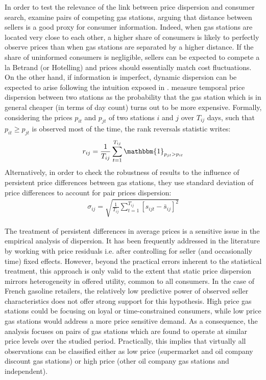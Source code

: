 \documentclass[english]{article}
\begin{document}
In order to test the relevance of the link between price dispersion and consumer search, \cite{TAP11} examine pairs of competing gas stations, arguing that distance between sellers is a good proxy for consumer information. Indeed, when gas stations are located very close to each other, a higher share of consumers is likely to perfectly observe prices than when gas stations are separated by a higher distance. If the share of uninformed consumers is negligible, sellers can be expected to compete a la Betrand (or Hotelling) and prices should essentially match cost fluctuations. On the other hand, if information is imperfect, dynamic dispersion can be expected to arise following the intuition exposed in \cite{VAR80}. \cite{TAP11} measure temporal price dispersion between two stations as the probability that the gas station which is in general cheaper (in terms of day count) turns out to be more expensive. Formally, considering the prices $p_{it}$ and $p_{jt}$ of two stations $i$ and $j$ over $T_{ij}$ days, such that $p_{it} \ge p_{jt}$ is observed most of the time, the rank reversals statistic writes:
\begin{align*}
r_{ij} = \frac{1}{T_{ij}} \sum_{t=1}^{T_{ij}} \mathbbm{1}_{p_{jt} > p_{it}}
\end{align*}
Alternatively, in order to check the robustness of results to the influence of persistent price differences between gas stations, they use standard deviation of price differences to account for pair prices dispersion:
\begin{align*}
\sigma_{ij} = \sqrt{\frac{1}{T_{ij}} \sum_{t=1}^{T_{ij}} [s_{ijt} - \bar{s}_{ij}]^2}
\end{align*}

The treatment of persistent differences in average prices is a sensitive issue in the empirical analysis of dispersion. It has been frequently addressed in the literature by working with price residuals i.e. after controlling for seller (and occasionally time) fixed effects. However, beyond the practical errors inherent to the statistical treatment, this approach is only valid to the extent that static price dispersion mirrors heterogeneity in offered utility, common to all consumers. In the case of French gasoline retailers, the relatively low predictive power of observed seller characteristics does not offer strong support for this hypothesis. High price gas stations could be focusing on loyal or time-constrained consumers, while low price gas stations would address a more price sensitive demand. As a consequence, the analysis focuses on pairs of gas stations which are found to operate at similar price levels over the studied period. Practically, this implies that virtually all observations can be classified either as low price (supermarket and oil company discount gas stations) or high price (other oil company gas stations and independent).
\end{document}
